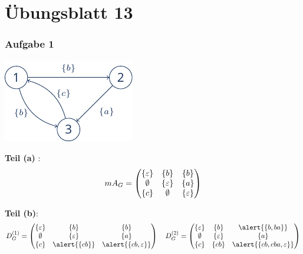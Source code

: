 \documentclass{beamer}
\begin{document}
\section{Übungsblatt 13}

\begin{frame} \frametitle{Aufgabe 1}
	\begin{minipage}{\dimexpr0.5\linewidth-\fboxrule-\fboxsep}
		\includegraphics[width=\linewidth]{./tut13_task1-graph.pdf}
	\end{minipage} 
	\pause
	\begin{minipage}{\dimexpr0.5\linewidth-\fboxrule-\fboxsep}
		\centering
		\textbf{Teil (a)} : 
		\begin{equation*}
			mA_G = \begin{pmatrix}
			\left\{ \varepsilon \right\} & \left\{ b \right\} & \left\{ b \right\} \\
			\emptyset & \left\{ \varepsilon \right\} & \left\{ a \right\} \\
			\left\{ c \right\} & \emptyset & \left\{ \varepsilon \right\}
			\end{pmatrix}
		\end{equation*}
	\end{minipage}
	\pause
	\vspace{2em}
	
	\textbf{Teil (b)}:
	\begin{equation*}
		D_G^{(1)} = 
		\begin{pmatrix}
			\menge{\epsilon} & \menge{b} & \menge{b} \\
			\emptyset & \menge{\epsilon} & \menge{a} \\
			\menge{c} & \alert{\menge{cb}} & \alert{\menge{cb,\epsilon}}
		\end{pmatrix} 
		\quad 
		D_G^{(2)} = 
		\begin{pmatrix}
			\menge{\epsilon} & \menge{b} & \alert{\menge{b, ba}} \\
			\emptyset & \menge{\epsilon} & \menge{a} \\
			\menge{c} & \menge{cb} & \alert{\menge{cb, cba, \epsilon}}
		\end{pmatrix} 
	\end{equation*}
\end{frame}
\end{document}
